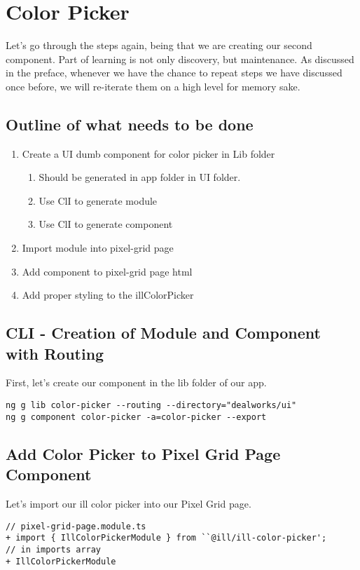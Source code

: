 
\chapter{ Color Picker }

Let's go through the steps again, being that we are creating our second
component. Part of learning is not only discovery, but maintenance. As discussed
in the preface, whenever we have the chance to repeat steps we have discussed
once before, we will re-iterate them on a high level for memory sake.

\section{ Outline of what needs to be done }
\begin{enumerate}
  \item Create a UI dumb component for color picker in Lib folder
    \begin{enumerate}
      \item Should be generated in app folder in UI folder.
      \item Use ClI to generate module
      \item Use ClI to generate component
    \end{enumerate}
  \item Import module into pixel-grid page
  \item Add component to pixel-grid page html
  \item Add proper styling to the illColorPicker
\end{enumerate}

\section{ CLI - Creation of Module and Component with Routing }
First, let's create our component in the lib folder of our app.

\begin{lstlisting}
ng g lib color-picker --routing --directory="dealworks/ui"
ng g component color-picker -a=color-picker --export
\end{lstlisting}

\section{ Add Color Picker to Pixel Grid Page Component }
Let's import our ill color picker into our Pixel Grid page.

\begin{lstlisting}
// pixel-grid-page.module.ts
+ import { IllColorPickerModule } from ``@ill/ill-color-picker';
// in imports array
+ IllColorPickerModule
\end{lstlisting}

